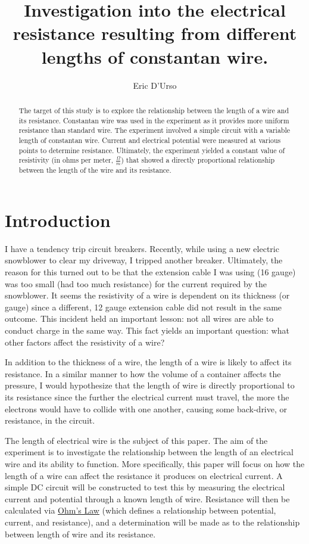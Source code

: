 \documentclass{article}
\title{Investigation into the electrical resistance resulting from different lengths of constantan wire.}
\author{Eric D’Urso}
\begin{document}
\maketitle

\doublespacing
\begin{abstract}
The target of this study is to explore the relationship between the length of a wire and its resistance. Constantan wire was used in the experiment as it provides more uniform resistance than standard wire. The experiment involved a simple circuit with a variable length of constantan wire. Current and electrical potential were measured at various points to determine resistance. Ultimately, the experiment yielded a constant value of resistivity (in ohms per meter, $\frac{\Omega}{m}$) that showed a directly proportional relationship between the length of the wire and its resistance.
\end{abstract}

\section{Introduction}
\label{sec:intro}

I have a tendency trip circuit breakers. Recently, while using a new electric snowblower to clear my driveway, I tripped another breaker. Ultimately, the reason for this turned out to be that the extension cable I was using (16 gauge) was too small (had too much resistance) for the current required by the snowblower. It seems the resistivity of a wire is dependent on its thickness (or gauge) since a different, 12 gauge extension cable did not result in the same outcome. This incident held an important lesson: not all wires are able to conduct charge in the same way. This fact yields an important question: what other factors affect the resistivity of a wire?

In addition to the thickness of a wire, the length of a wire is likely to affect its resistance. In a similar manner to how the volume of a container affects the pressure, I would hypothesize that the length of wire is directly proportional to its resistance since the further the electrical current must travel, the more the electrons would have to collide with one another, causing some back-drive, or resistance, in the circuit.

The length of electrical wire is the subject of this paper. The aim of the experiment is to investigate the relationship between the length of an electrical wire and its ability to function. More specifically, this paper will focus on how the length of a wire can affect the resistance it produces on electrical current. A simple DC circuit will be constructed to test this by measuring the electrical current and potential through a known length of wire. Resistance will then be calculated via \hyperref[sec:ohm]{Ohm's Law} (which defines a relationship between potential, current, and resistance), and a determination will be made as to the relationship between length of wire and its resistance.
\end{document}
